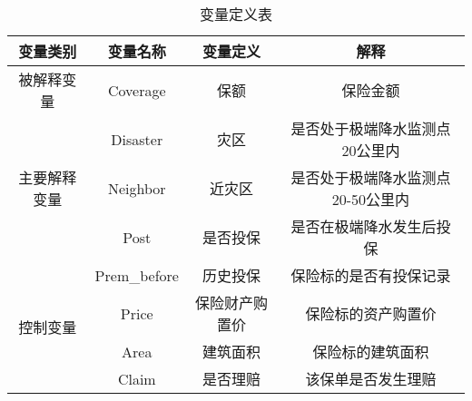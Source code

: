 \begin{table}[H]
    \caption{变量定义表}\label{tab:var}
    \begin{tabular}{@{}cccc@{}}
        \toprule
        变量类别                    & 变量名称    & 变量定义   & 解释           \\ \midrule
        被解释变量                   & Coverage    & 保额      & 保险金额    \\ \midrule
        \multirow{3}{*}{主要解释变量} & Disaster    & 灾区      & 是否处于极端降水监测点20公里内    \\ \cmidrule(l){2-4}
                                & Neighbor    & 近灾区     & 是否处于极端降水监测点20-50公里内 \\ \cmidrule(l){2-4}
                                & Post        & 是否投保    &  是否在极端降水发生后投保                 \\ \midrule
        \multirow{4}{*}{控制变量}   & Prem\_before & 历史投保    & 保险标的是否有投保记录        \\ \cmidrule(l){2-4}
                                & Price       & 保险财产购置价 & 保险标的资产购置价            \\ \cmidrule(l){2-4}
                                & Area        & 建筑面积    & 保险标的建筑面积                  \\ \cmidrule(l){2-4}
                                & Claim       & 是否理赔    & 该保单是否发生理赔            \\ \bottomrule
    \end{tabular}
\end{table}

